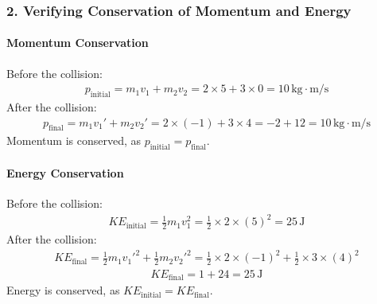 \documentclass[letterpaper,10pt,english]{jupyterBook}
\begin{document}
\subsubsection{2. Verifying Conservation of Momentum and Energy}
\label{\detokenize{prerequisites:verifying-conservation-of-momentum-and-energy}}

\paragraph{Momentum Conservation}
\label{\detokenize{prerequisites:momentum-conservation}}
\sphinxAtStartPar
Before the collision:
\begin{equation*}
\begin{split}
p_\text{initial} = m_1 v_1 + m_2 v_2 = 2 \times 5 + 3 \times 0 = 10 \, \text{kg} \cdot \text{m/s}
\end{split}
\end{equation*}
\sphinxAtStartPar
After the collision:
\begin{equation*}
\begin{split}
p_\text{final} = m_1 v_1' + m_2 v_2' = 2 \times (-1) + 3 \times 4 = -2 + 12 = 10 \, \text{kg} \cdot \text{m/s}
\end{split}
\end{equation*}
\sphinxAtStartPar
Momentum is conserved, as \(p_\text{initial} = p_\text{final}\).


\paragraph{Energy Conservation}
\label{\detokenize{prerequisites:energy-conservation}}
\sphinxAtStartPar
Before the collision:
\begin{equation*}
\begin{split}
KE_\text{initial} = \frac{1}{2} m_1 v_1^2 = \frac{1}{2} \times 2 \times (5)^2 = 25 \, \text{J}
\end{split}
\end{equation*}
\sphinxAtStartPar
After the collision:
\begin{equation*}
\begin{split}
KE_\text{final} = \frac{1}{2} m_1 v_1'^2 + \frac{1}{2} m_2 v_2'^2 = \frac{1}{2} \times 2 \times (-1)^2 + \frac{1}{2} \times 3 \times (4)^2
\end{split}
\end{equation*}\begin{equation*}
\begin{split}
KE_\text{final} = 1 + 24 = 25 \, \text{J}
\end{split}
\end{equation*}
\sphinxAtStartPar
Energy is conserved, as \(KE_\text{initial} = KE_\text{final}\).
\end{document}
